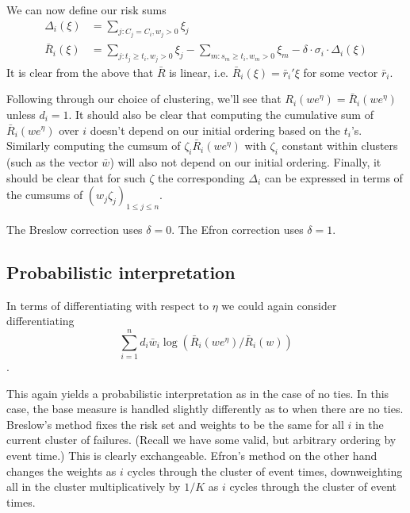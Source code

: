 \documentclass{article}
\begin{document}
We can now define our risk sums
\begin{equation}
    \label{eq:risk:sum}
    \begin{aligned}
\Delta_i(\xi) &= \sum_{j:C_j=C_i, w_j>0} \xi_j  \\
\bar{R}_i(\xi) &= \sum_{j: t_j \geq t_{i}, w_j>0} \xi_j - 
\sum_{m: s_m \geq t_i, w_m>0} \xi_m
- \delta \cdot \sigma_i \cdot \Delta_i(\xi)
\end{aligned}
\end{equation}
It is clear from the above that $\bar{R}$ is linear, i.e. $\bar{R}_i(\xi)=\bar{r}_i'\xi$ for some vector $\bar{r}_i$.


Following through our choice of clustering, we'll
see that $R_i(we^{\eta})=\bar{R}_i(we^{\eta})$ unless $d_i=1$.
It should also be clear that computing the cumulative sum of $\bar{R}_i(we^{\eta})$ over $i$ doesn't 
depend on our initial ordering based on the $t_i$'s. Similarly
computing the cumsum of $\zeta_i \bar{R}_i(we^{\eta})$ with $\zeta_i$ constant within
clusters (such as the vector $\bar{w}$) will also not depend on our initial ordering. Finally,
it should be clear that for such $\zeta$ the corresponding $\Delta_i$ can be expressed in terms of the cumsums of $(w_j \zeta_j)_{1 \leq j \leq n}$.

The Breslow correction uses $\delta=0$. The Efron correction
uses $\delta=1$.

\subsection{Probabilistic interpretation}


In terms of differentiating with respect to
$\eta$ we could again consider differentiating
\begin{equation}
\label{eq:loglik:final}
    \sum_{i=1}^n d_i \bar{w}_i
\log(\bar{R}_i(we^{\eta})/\bar{R}_i(w))
\end{equation}
.

This again yields a probabilistic interpretation 
as in the case of no ties. In this case, the base measure
is handled slightly differently as to when there are no ties.
Breslow's method fixes the risk set and weights to be the
same for all $i$ in the current cluster of failures. (Recall we have some valid, but arbitrary ordering by event time.) This is
clearly exchangeable. Efron's method on the other hand changes
the weights as $i$ cycles through the cluster of event times, downweighting all in the cluster multiplicatively by $1/K$
as $i$ cycles through the cluster of event times.
\end{document}

